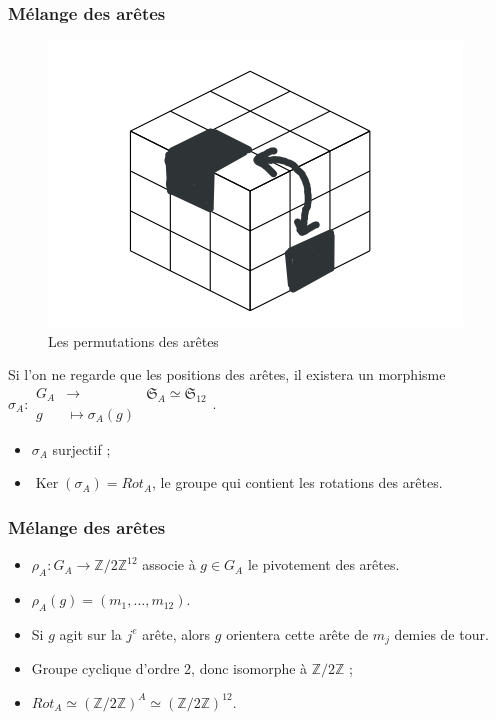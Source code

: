 \documentclass[10pt,notheorems]{beamer}
\theoremstyle{plain}
\theoremstyle{definition}
\theoremstyle{plain}
\theoremstyle{plain}
\theoremstyle{plain}
\theoremstyle{remark}
\begin{document}
\begin{frame}
  \frametitle{Mélange des arêtes}
  \begin{figure}
    \centering
    \includegraphics[scale=0.2]{figures/arete-permutation.png}
    \caption{Les permutations des arêtes}
    \label{arete-permutation}
  \end{figure}


    Si l'on ne regarde que les positions des arêtes, il existera un morphisme $\sigma_A :
      \begin{array}{ccc}
      G_A & \longrightarrow & \mathfrak{S}_{A} \simeq \mathfrak{S}_{12}   \\
      g & \longmapsto \sigma_A(g)
      \end{array}$.

    \begin{itemize}
      \item $\sigma_A $ surjectif ;
      \item $\operatorname{Ker}(\sigma_A) = Rot_A$, le groupe qui contient les rotations des arêtes.
    \end{itemize}
\end{frame}

\begin{frame}
  \frametitle{Mélange des arêtes}

  \begin{itemize}
    \item $\rho_A : G_A \to \mathbb{Z}/{ 2 }\mathbb{Z} ^{12}$ associe à $g \in G_A$ le pivotement des arêtes.
    \item $\rho_A(g) = (m_1, \dots, m _{12})$.
    \item Si $g$ agit sur la $j ^{e}$ arête, alors $g$ orientera cette arête de $m_j$ demies de tour.
    \item Groupe cyclique d'ordre 2, donc isomorphe à $\mathbb{Z}/{ 2 }\mathbb{Z}$ ;
    \item $Rot_A \simeq (\mathbb{Z}/{ 2 }\mathbb{Z}) ^{A} \simeq (\mathbb{Z}/{ 2}\mathbb{Z}) ^{12}$.
  \end{itemize}
\end{frame}
\end{document}
